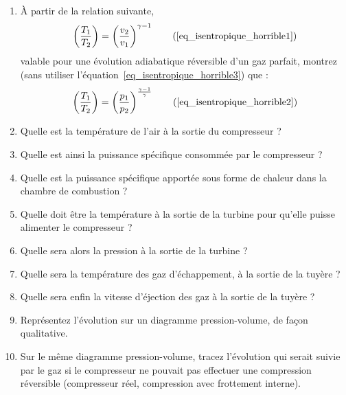 	\begin{enumerate}
		\item À partir de la relation suivante,
			\begin{equation}
				\left( \frac{T_1}{T_2} \right)	= \left( \frac{v_2}{v_1} \right)^{\gamma -1} \tag{\ref{eq_isentropique_horrible1}}
			\end{equation}
			valable pour une évolution adiabatique réversible d’un gaz parfait, montrez (sans utiliser l’équation~\ref{eq_isentropique_horrible3}) que :			
			\begin{equation}
				\left( \frac{T_1}{T_2} \right)	=  \left( \frac{p_1}{p_2} \right)^{\frac{\gamma -1}{\gamma}} \tag{\ref{eq_isentropique_horrible2}}
			\end{equation}
		\item Quelle est la température de l’air à la sortie du compresseur ?
		\item Quelle est ainsi la puissance spécifique consommée par le compresseur ?
		\item Quelle est la puissance spécifique apportée sous forme de chaleur dans la chambre de combustion ?
		\item Quelle doit être la température à la sortie de la turbine pour qu’elle puisse alimenter le compresseur ?
		\item Quelle sera alors la pression à la sortie de la turbine ?
		\item Quelle sera la température des gaz d’échappement, à la sortie de la tuyère ?
		\item Quelle sera enfin la vitesse d’éjection des gaz à la sortie de la tuyère ?
		\item Représentez l’évolution sur un diagramme pression-volume, de façon qualitative.
		\item Sur le même diagramme pression-volume, tracez l’évolution qui serait suivie par le gaz si le compresseur ne pouvait pas effectuer une compression réversible (compresseur réel, compression avec frottement interne).
	\end{enumerate}

